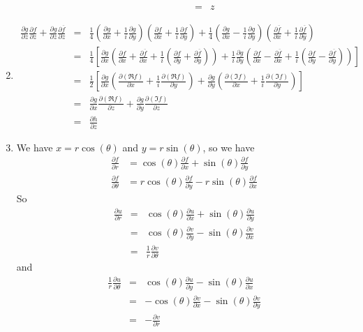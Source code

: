 \documentclass{article}
\newcommand\conj{\overline}
\newcommand\ptl[2]{\frac{\partial{#1}}{\partial{#2}}}
\begin{document}
\begin{enumerate}
\begin{enumerate}
\begin{enumerate}
\begin{eqnarray*}
        &=& z
      \end{eqnarray*}
    \end{enumerate}
  \end{enumerate}
\item
  \newcommand\p[4]{\ptl{#1}{#2}\ptl{#3}{#4}}
  \newcommand\cf{\conj f}
  \begin{eqnarray*}
    \ptl gz \ptl fz + \ptl g{\conj z} \ptl{\conj f}z &=&
    \frac14 \left(\ptl gx + \frac1i \ptl gy\right) \left(\ptl
      fx+\frac1i\ptl fy\right) + \frac14\left(\ptl gx - \frac1i\ptl
      gy\right)\left(\ptl{\conj f}x + \frac1i\ptl{\conj f}y\right) \\
    &=& \frac14 \left[ \ptl gx \left( \ptl fx + \ptl \cf x + \frac1i
        \left( \ptl fy + \ptl \cf y \right)\right) + \frac1i \ptl gy
      \left( \ptl fx - \ptl \cf x + \frac 1i\left( \ptl fy - \ptl \cf
          y \right)
      \right)\right] \\
    &=& \frac12 \left[ \ptl gx \left( \ptl {(\Re f)}x + \frac1i \ptl {(\Re
          f)}y \right) + \ptl gy \left( \ptl {(\Im f)} x +
        \frac1i \ptl {(\Im f)} y \right) \right] \\
    &=& \p gx{(\Re f)}z + \p gy{(\Im f)}z \\
    &=& \ptl hz
  \end{eqnarray*}
\item
  We have $x = r\cos(\theta)$ and $y = r\sin(\theta)$, so we have
  \begin{align}
    \ptl fr &= \cos(\theta)\ptl fx + \sin(\theta)\ptl fy \\
    \ptl f\theta &= r\cos(\theta)\ptl fy - r\sin(\theta)\ptl fx
  \end{align}
  So
  \begin{eqnarray*}
    \ptl ur &=& \cos(\theta)\ptl ux + \sin(\theta)\ptl uy \\
    &=& \cos(\theta) \ptl vy - \sin(\theta) \ptl vx \\
    &=& \frac1r \ptl v\theta
  \end{eqnarray*} and
  \begin{eqnarray*}
    \frac1r\ptl u\theta &=& \cos(\theta)\ptl uy - \sin(\theta)\ptl ux
    \\
    &=& -\cos(\theta)\ptl vx - \sin(\theta)\ptl vy \\
    &=& -\ptl vr
  \end{eqnarray*}


\end{enumerate}
\end{document}
